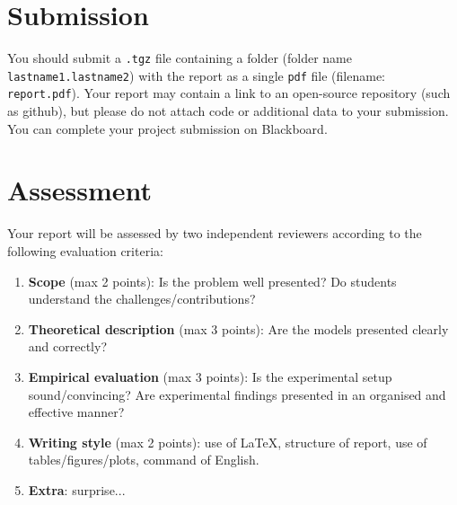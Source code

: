 \section{Submission}

You should submit a \texttt{.tgz} file containing a folder (folder name {\tt lastname1.lastname2}) with the report as a single \texttt{pdf} file (filename: {\tt report.pdf}).
Your report may contain a link to an open-source repository (such as github), but please do not attach code or additional data to your submission. You can complete your project submission on Blackboard.

\section{Assessment}

Your report will be assessed by two independent reviewers according to the following evaluation criteria:
\begin{enumerate}
	\item \textbf{Scope} (max 2 points): Is the problem well presented? Do students understand the challenges/contributions?
	\item \textbf{Theoretical description} (max 3 points): Are the models presented clearly and correctly?
	\item \textbf{Empirical evaluation} (max 3 points): Is the experimental setup sound/convincing? Are experimental findings presented in an organised and effective manner? 
	\item \textbf{Writing style} (max 2 points): use of \LaTeX , structure of report, use of tables/figures/plots, command of English.
	\item \textbf{Extra}: surprise...
\end{enumerate}



